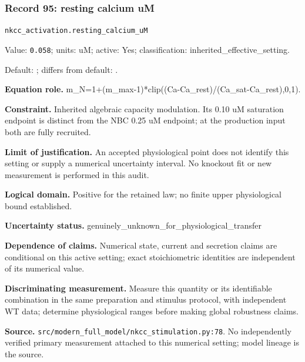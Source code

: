 \subsubsection*{Record 95: resting calcium uM}
{\small \nolinkurl{nkcc_activation.resting_calcium_uM}\par

Value: \texttt{0.058}; units: uM; active: Yes; classification: inherited\_effective\_setting.\par

Default: ; differs from default: .\par

\textbf{Equation role.} m\_N=1+(m\_max-1)*clip((Ca-Ca\_rest)/(Ca\_sat-Ca\_rest),0,1).\par

\textbf{Constraint.} Inherited algebraic capacity modulation. Its 0.10 uM saturation endpoint is distinct from the NBC 0.25 uM endpoint; at the production input both are fully recruited.\par

\textbf{Limit of justification.} An accepted physiological point does not identify this setting or supply a numerical uncertainty interval. No knockout fit or new measurement is performed in this audit.\par

\textbf{Logical domain.} Positive for the retained law; no finite upper physiological bound established.\par

\textbf{Uncertainty status.} genuinely\_unknown\_for\_physiological\_transfer\par

\textbf{Dependence of claims.} Numerical state, current and secretion claims are conditional on this active setting; exact stoichiometric identities are independent of its numerical value.\par

\textbf{Discriminating measurement.} Measure this quantity or its identifiable combination in the same preparation and stimulus protocol, with independent WT data; determine physiological ranges before making global robustness claims.\par

\textbf{Source.} \nolinkurl{src/modern_full_model/nkcc_stimulation.py:78}. No independently verified primary measurement attached to this numerical setting; model lineage is the source.\par}

